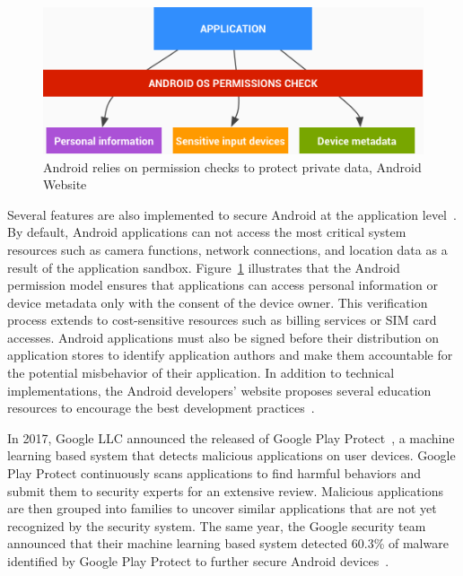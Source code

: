 \begin{figure}[!ht]
        \centering
	\includegraphics[width=0.75\linewidth]{figures/background/permissions.png}
        \caption[Android relies on permission checks to protect private data]{Android relies on permission checks to protect private data, Android Website~\cite{android_developers_application_2019-1}}
	\label{figure:background:permissions}
\end{figure}

Several features are also implemented to secure Android at the application level~\cite{android_developers_application_2019-1}.
By default, Android applications can not access the most critical system resources such as camera functions, network connections, and location data as a result of the application sandbox.
Figure~\ref{figure:background:permissions} illustrates that the Android permission model ensures that applications can access personal information or device metadata only with the consent of the device owner.
This verification process extends to cost-sensitive resources such as billing services or SIM card accesses.
Android applications must also be signed before their distribution on application stores to identify application authors and make them accountable for the potential misbehavior of their application.
In addition to technical implementations, the Android developers' website proposes several education resources to encourage the best development practices~\cite{android_developers_security_2019}.

In 2017, Google LLC announced the released of Google Play Protect~\cite{tetali_keeping_2018}, a machine learning based system that detects malicious applications on user devices.
Google Play Protect continuously scans applications to find harmful behaviors and submit them to security experts for an extensive review.
Malicious applications are then grouped into families to uncover similar applications that are not yet recognized by the security system.
The same year, the Google security team announced that their machine learning based system detected 60.3\% of malware identified by Google Play Protect to further secure Android devices~\cite{tetali_keeping_2018}.
